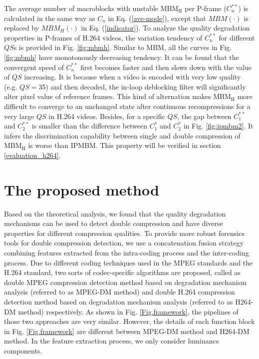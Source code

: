 \documentclass[journal,sort]{IEEEtran}
\begin{document}
The average number of macroblocks with unstable $\text{MBM}_\text{H}$ per P-frame ($C^{**}_n$) is calculated in the same way as $C_n$ in Eq. (\ref{ave-mode}), except that $MBM(\cdot)$ is replaced by $MBM_H(\cdot)$ in Eq. (\ref{indicator}). To analyze the quality degradation properties in P-frames of H.264 videos, the variation tendency of $C^{**}_n$ for different $QS$s is provided in Fig. \ref{fig:mbmh}. Similar to MBM, all the curves in Fig. \ref{fig:mbmh} have monotonously decreasing tendency. It can be found that the convergent speed of $C^{**}_n$ first becomes faster and then slows down with the value of $QS$ increasing. It is because when a video is encoded with very low quality (e.g. $QS=$35) and then decoded, the in-loop deblocking filter will significantly alter pixel value of reference frames. This kind of alternation makes $\text{MBM}_\text{H}$ more difficult to converge to an unchanged state after continuous recompressions for a very large $QS$ in H.264 videos. Besides, for a specific $QS$, the gap between $C^{**}_1$ and $C^{**}_2$ is smaller than the difference between $C^{*}_1$ and $C^{*}_2$ in Fig. \ref{fig:ipmbm2}. It infers the discrimination capability between single and double compression of $\text{MBM}_\text{H}$ is worse than IPMBM. This property will be verified in section \ref{evaluation_h264}. 



\section{The proposed method}
Based on the theoretical analysis, we found that the quality degradation mechanisms can be used to detect double compression and have diverse properties for different compression qualities. To provide more robust forensics tools for double compression detection, we use a concatenation fusion strategy combining features extracted from the intra-coding process and the inter-coding process. Due to different coding techniques used in the MPEG standards and the H.264 standard, two sorts of codec-specific algorithms are proposed, called as double MPEG compression detection method based on degradation mechanism analysis (referred to as MPEG-DM method) and double H.264 compression detection method based on degradation mechanism analysis (referred to as H264-DM method) respectively. As shown in Fig. \ref{Fig.framework}, the pipelines of those two approaches are very similar. However, the details of each function block in Fig. \ref{Fig.framework} are different between MPEG-DM method and H264-DM method. In the feature extraction process, we only consider luminance components. 
\end{document}
